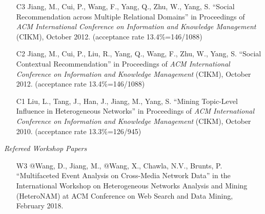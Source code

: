 \documentclass[10pt]{article}
\newenvironment{myindentpar}[1]%
{\begin{list}{}%
         {\setlength{\leftmargin}{#1}}%
         \item[]%
}
{\end{list}}
\newcounter{list}
\begin{document}
\begin{myindentpar}{0.00cm}
\begin{enumerate}[leftmargin=.5cm]
\vspace{-0.1cm}

\item[C3] Jiang, M., Cui, P., Wang, F., Yang, Q., Zhu, W., Yang, S. ``Social Recommendation across Multiple Relational Domains'' in Proceedings of \emph{ACM International Conference on Information and Knowledge Management} (CIKM), October 2012. (acceptance rate 13.4\%=146/1088)

\vspace{-0.1cm}

\item[C2] Jiang, M., Cui, P., Liu, R., Yang, Q., Wang, F., Zhu, W., Yang, S. ``Social Contextual Recommendation'' in Proceedings of \emph{ACM International Conference on Information and Knowledge Management} (CIKM), October 2012. (acceptance rate 13.4\%=146/1088)

\vspace{-0.1cm}

\item[C1] Liu, L., Tang, J., Han, J., Jiang, M., Yang, S. ``Mining Topic-Level Influence in Heterogeneous Networks'' in Proceedings of \emph{ACM International Conference on Information and Knowledge Management} (CIKM), October 2010. (acceptance rate 13.3\%=126/945)

\vspace{-0.1cm}

\end{enumerate}

\hspace{-0.25cm}\emph{Refereed Workshop Papers}

\begin{enumerate}[leftmargin=.5cm]

\item[W3] @Wang, D., Jiang, M., @Wang, X., Chawla, N.V., Brunts, P. ``Multifaceted Event Analysis on Cross-Media Network Data'' in the International Workshop on Heterogeneous Networks Analysis and Mining (HeteroNAM) at ACM Conference on Web Search and Data Mining, February 2018.


\end{enumerate}
\end{myindentpar}
\end{document}
